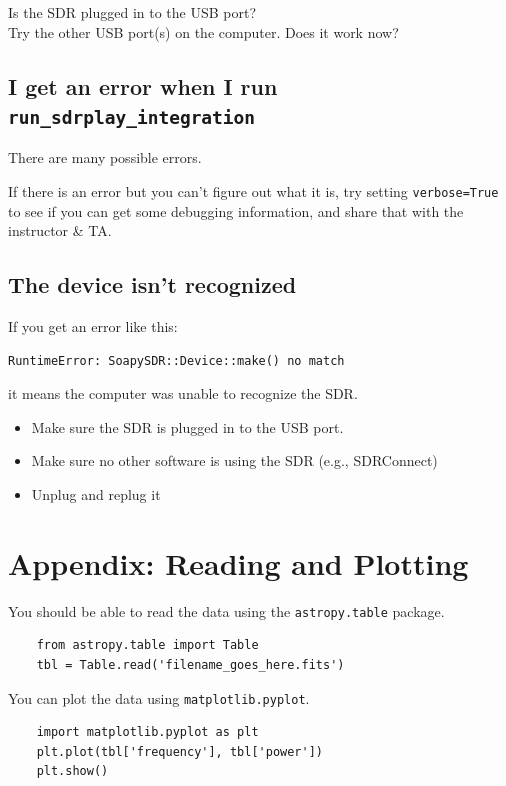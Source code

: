 \documentclass[11pt]{article}
\begin{document}
Is the SDR plugged in to the USB port?\\
Try the other USB port(s) on the computer.  Does it work now?\\


\subsection{I get an error when I run \texttt{run\_sdrplay\_integration}}
There are many possible errors.

If there is an error but you can't figure out what it is,
try setting \verb|verbose=True| to see if you can get some
debugging information, and share that with the instructor \& TA.




\subsection{The device isn't recognized}

If you get an error like this:
\begin{verbatim}
RuntimeError: SoapySDR::Device::make() no match
\end{verbatim}
it means the computer was unable to recognize the SDR.

\begin{itemize}
    \item Make sure the SDR is plugged in to the USB port.
    \item Make sure no other software is using the SDR (e.g., SDRConnect)
    \item Unplug and replug it
\end{itemize}


\section{Appendix: Reading and Plotting}

You should be able to read the data using the \verb|astropy.table| package.

\begin{verbatim}
    from astropy.table import Table
    tbl = Table.read('filename_goes_here.fits')
\end{verbatim}

You can plot the data using \verb|matplotlib.pyplot|.

\begin{verbatim}
    import matplotlib.pyplot as plt
    plt.plot(tbl['frequency'], tbl['power'])
    plt.show()
\end{verbatim}
\end{document}
